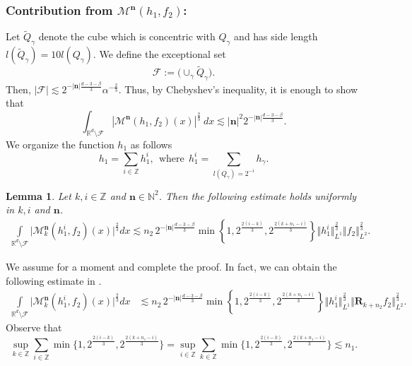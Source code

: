\documentclass[a4paper,reqno]{amsart}
\newtheorem{lemma}{Lemma}[section]
\newcounter{old}
\numberwithin{equation}{section}
\newcommand{\Z}{{\mathbb Z}}
\begin{document}
	\subsubsection*{\bf Contribution from $\mathcal{M}^{\mathbf{n}}(h_1,f_2)$:}
	Let $\tilde{Q}_{\gamma}$ denote the cube which is concentric with ${Q}_{\gamma}$ and has side length $l(\tilde{Q}_{\gamma})=10l(Q_{\gamma})$. We define the exceptional set 
	\[\mathcal{F}:=\Big(\cup_{\gamma}\tilde{Q}_{\gamma}\Big).\]
	Then, $|\mathcal{F}|\lesssim2^{-|\mathbf{n}|\frac{d-3-\beta}{3}}\alpha^{-\frac{2}{3}}$. Thus, by  Chebyshev's inequality, it is enough to show that
	\begin{equation}\label{other}
		\int_{\mathbb{R}^d\setminus \mathcal{F}}|\mathcal{M}^{\mathbf{n}}(h_1,f_2)(x)|^{\frac{2}{3}}~dx\lesssim |\mathbf{n}|^{2} 2^{-|\mathbf{n}|\frac{d-3-\beta}{3}}.
	\end{equation}
	We organize the function $h_1$ as follows
	\[h_{1}=\sum_{i\in\mathbb{Z}}h^{i}_{1},~~\text{where}~~h^{i}_{1}=\sum_{l(Q_{\gamma})=2^{-i}}h_{\gamma}.\]
	\begin{lemma}\label{badfunction2}
		Let $k,i\in\mathbb{Z}$ and $\mathbf{n}\in\mathbb{N}^2$. Then the following estimate holds uniformly in $k,i$ and $\mathbf{n}$.
		\begin{align*}
			\int\limits_{\mathbb{R}^{d}\setminus \mathcal{F}}\Big|\mathcal{M}^{\mathbf{n}}_k(h^{i}_1,f_2)(x)\Big|^{\frac{2}{3}}dx\lesssim n_2\,2^{-|\mathbf{n}|\frac{d-3-\beta}{3}}\min\left\{1,2^{\frac{2(i-k)}{3}},2^{\frac{2(k+n_1-i)}{3}}\right\}\Vert h^{i}_{1}\Vert^{\frac{2}{3}}_{L^{1}}\Vert f_{2}\Vert^{\frac{2}{3}}_{L^{2}}.
		\end{align*} 
	\end{lemma}
	We assume  for a moment and complete the proof. In fact, we can obtain the following estimate in .
	\begin{align*}
		\int\limits_{\mathbb{R}^{d}\setminus \mathcal{F}}\Big|\mathcal{M}^{\mathbf{n}}_k(h^{i}_1,f_2)(x)\Big|^{\frac{2}{3}}dx
		&\lesssim n_2\,2^{-|\mathbf{n}|\frac{d-3-\beta}{3}}\min\left\{1,2^{\frac{2(i-k)}{3}},2^{\frac{2(k+n_1-i)}{3}}\right\}\Vert h^{i}_{1}\Vert^{\frac{2}{3}}_{L^{1}}\Vert \mathbf{R}_{k+n_2}f_{2}\Vert^{\frac{2}{3}}_{L^{2}}.
	\end{align*}
	Observe that
	\[\sup_{k\in\Z}\sum_{i\in\Z}\min\big\{1,2^{\frac{2(i-k)}{3}},2^{\frac{2(k+n_1-i)}{3}}\big\}=\sup_{i\in\Z}\sum_{k\in\Z}\min\big\{1,2^{\frac{2(i-k)}{3}},2^{\frac{2(k+n_1-i)}{3}}\big\}\lesssim n_1.\]
	
\end{document}
